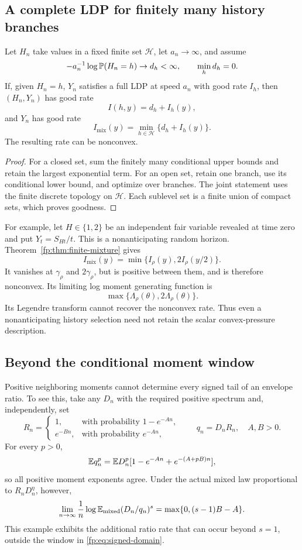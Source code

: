 \subsection{A complete LDP for finitely many history branches}
\begin{theorem}\label{fp:thm:finite-mixture}
Let $H_n$ take values in a fixed finite set $\mathcal H$, let $a_n\to\infty$, and assume
\[
 -a_n^{-1}\log\mathbb P(H_n=h)\to d_h<\infty,\qquad\min_hd_h=0.
\]
If, given $H_n=h$, $Y_n$ satisfies a full LDP at speed $a_n$ with good rate $I_h$, then $(H_n,Y_n)$ has good rate
\[
 I(h,y)=d_h+I_h(y),
\]
and $Y_n$ has good rate
\begin{equation}\label{fp:eq:mixture-rate}
 I_{\mathrm{mix}}(y)=\min_{h\in\mathcal H}\{d_h+I_h(y)\}.
\end{equation}
The resulting rate can be nonconvex.
\end{theorem}
\begin{proof}
For a closed set, sum the finitely many conditional upper bounds and retain the largest exponential term. For an open set, retain one branch, use its conditional lower bound, and optimize over branches. The joint statement uses the finite discrete topology on $\mathcal H$. Each sublevel set is a finite union of compact sets, which proves goodness.
\end{proof}
For example, let $H\in\{1,2\}$ be an independent fair variable revealed at time zero and put $Y_t=S_{Ht}/t$. This is a nonanticipating random horizon. Theorem~\ref{fp:thm:finite-mixture} gives
\[
 I_{\mathrm{mix}}(y)=\min\{I_\rho(y),2I_\rho(y/2)\}.
\]
It vanishes at $\gamma_\rho$ and $2\gamma_\rho$, but is positive between them, and is therefore nonconvex. Its limiting log moment generating function is
\[
 \max\{\Lambda_\rho(\theta),2\Lambda_\rho(\theta)\}.
\]
Its Legendre transform cannot recover the nonconvex rate. Thus even a nonanticipating history selection need not retain the scalar convex-pressure description.

\subsection{Beyond the conditional moment window}
Positive neighboring moments cannot determine every signed tail of an envelope ratio. To see this, take any $D_n$ with the required positive spectrum and, independently, set
\[
 R_n=
 \begin{cases}
 1,&\text{with probability }1-e^{-An},\\
 e^{-Bn},&\text{with probability }e^{-An},
 \end{cases}
 \qquad q_n=D_nR_n,\quad A,B>0.
\]
For every $p>0$,
\[
 \mathbb E q_n^p=\mathbb E D_n^p[1-e^{-An}+e^{-(A+pB)n}],
\]
so all positive moment exponents agree. Under the actual mixed law proportional to $R_nD_n^\eta$, however,
\begin{equation}\label{fp:eq:ratio-counterexample}
 \lim_{n\to\infty}\frac1n
 \log\mathbb E_{\mathrm{mixed}}(D_n/q_n)^s
 =\max\{0,(s-1)B-A\}.
\end{equation}
This example exhibits the additional ratio rate that can occur beyond
$s=1$, outside the window in \eqref{fp:eq:signed-domain}.

